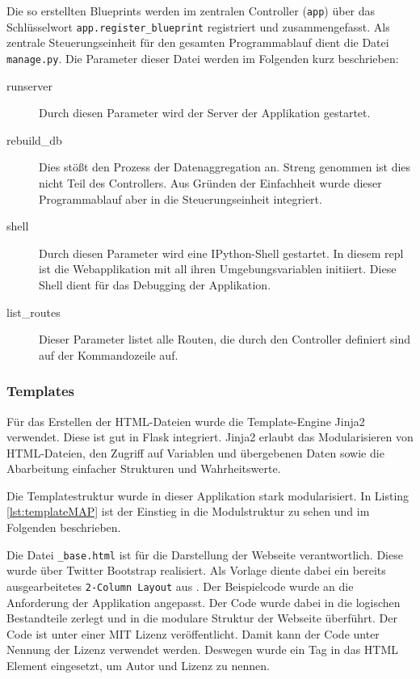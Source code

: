 Die so erstellten Blueprints werden im zentralen \gls{Controller} (\texttt{app}) über das Schlüsselwort \texttt{app.register\_blueprint} registriert und zusammengefasst.
Als zentrale Steuerungseinheit für den gesamten Programmablauf dient die Datei \texttt{manage.py}. Die Parameter dieser Datei werden im Folgenden kurz beschrieben:

\begin{description}

 \item [runserver] Durch diesen Parameter wird der Server der Applikation gestartet.


 \item [rebuild\_db] Dies stößt den Prozess der Datenaggregation an.  Streng genommen ist dies nicht Teil des \gls{Controller}s. Aus Gründen der Einfachheit wurde dieser Programmablauf aber in die Steuerungseinheit integriert.

 \item [shell] Durch diesen Parameter wird eine IPython-Shell gestartet. In diesem repl ist die Webapplikation mit all ihren Umgebungsvariablen initiiert. Diese Shell dient für das Debugging der Applikation.

 \item [list\_routes] Dieser Parameter listet alle Routen, die durch den Controller definiert sind auf der Kommandozeile auf.
\end{description}


\subsubsection{Templates}

Für das Erstellen der HTML-Dateien wurde die Template-Engine Jinja2 verwendet. Diese ist gut in Flask integriert. Jinja2 erlaubt das Modularisieren von HTML-Dateien, den Zugriff auf Variablen und übergebenen Daten sowie die Abarbeitung einfacher Strukturen und Wahrheitswerte.


Die Templatestruktur wurde in dieser Applikation stark modularisiert.  In Listing \ref{lst:templateMAP} ist der Einstieg in die Modulstruktur zu sehen und im Folgenden beschrieben.

Die Datei \texttt{\_base.html} ist für die Darstellung der Webseite verantwortlich. Diese wurde über Twitter Bootstrap realisiert. Als Vorlage diente dabei ein bereits ausgearbeitetes  \texttt{2-Column Layout} aus \cite{Ng2014}. Der Beispielcode wurde an die Anforderung der Applikation angepasst. Der Code wurde dabei in die logischen Bestandteile zerlegt und in die modulare Struktur der Webseite überführt. Der Code ist unter einer MIT Lizenz veröffentlicht. Damit kann der Code unter Nennung der Lizenz verwendet werden. Deswegen wurde ein Tag in das \gls{HTML} Element eingesetzt, um Autor und Lizenz zu nennen.

